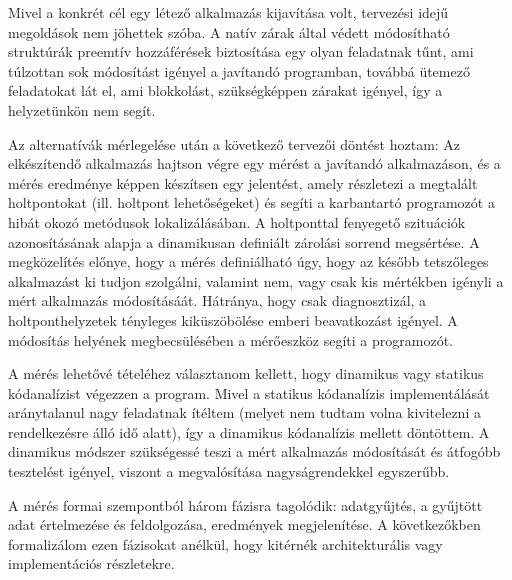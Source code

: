     Mivel a konkrét cél egy létező alkalmazás kijavítása volt, tervezési idejű megoldások nem jöhettek szóba. A natív zárak által védett módosítható struktúrák preemtív hozzáférések biztosítása egy olyan feladatnak tűnt, ami túlzottan sok módosítást igényel a javítandó programban, továbbá ütemező feladatokat lát el, ami blokkolást, szükségképpen zárakat igényel, így a helyzetünkön nem segít.
    
    Az alternatívák mérlegelése után a következő tervezői döntést hoztam: Az elkészítendő alkalmazás hajtson végre egy mérést a javítandó alkalmazáson, és a mérés eredménye képpen készítsen egy jelentést, amely részletezi a megtalált holtpontokat (ill. holtpont lehetőségeket) és segíti a karbantartó programozót a hibát okozó metódusok lokalizálásában. A holtponttal fenyegető szituációk azonosításának alapja a dinamikusan definiált zárolási sorrend megsértése. A megközelítés előnye, hogy a mérés definiálható úgy, hogy az később tetszőleges alkalmazást ki tudjon szolgálni, valamint nem, vagy csak kis mértékben igényli a mért alkalmazás módosításáát. Hátránya, hogy csak diagnosztizál, a holtponthelyzetek tényleges kiküszöbölése emberi beavatkozást igényel. A módosítás helyének megbecsülésében a mérőeszköz segíti a programozót.
    
    A mérés lehetővé tételéhez választanom kellett, hogy dinamikus vagy statikus kódanalízist végezzen a program. Mivel a statikus kódanalízis implementálását aránytalanul nagy feladatnak ítéltem (melyet nem tudtam volna kivitelezni a rendelkezésre álló idő alatt), így a dinamikus kódanalízis mellett döntöttem. A dinamikus módszer szükségessé teszi a mért alkalmazás módosítását és átfogóbb tesztelést igényel, viszont a megvalósítása nagyságrendekkel egyszerűbb.
    
    A mérés formai szempontból három fázisra tagolódik: adatgyűjtés, a gyűjtött adat értelmezése és feldolgozása, eredmények megjelenítése. A következőkben formalizálom ezen fázisokat anélkül, hogy kitérnék architekturális vagy implementációs részletekre.
    

